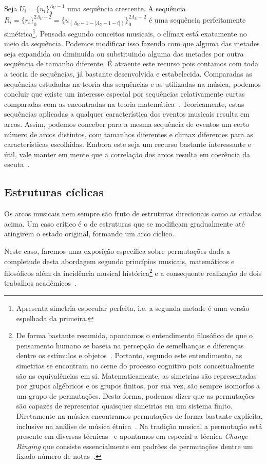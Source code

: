 Seja $U_i=\{u_i\}_0^{\Lambda_U-1}$ uma sequência crescente. A sequência 
$R_i=\{r_i\}_0^{2\Lambda_U -2}=\{u_{(\Lambda_U-1-|\Lambda_U-1-i|)}\}_0^{2\Lambda_U-2}$ 
é uma sequência perfeitamente simétrica\footnote{Apresenta simetria especular perfeita, i.e. a segunda metade é uma versão espelhada da primeira.}. Pensada segundo conceitos musicais, o clímax está exatamente no meio da sequência. Podemos modificar isso fazendo com que alguma das metades seja expandida ou diminuída ou substituindo alguma das metades por outra sequência de tamanho diferente. É atraente este recurso pois contamos com toda a teoria de sequências, já bastante desenvolvida e estabelecida. Comparadas as sequências estudadas na teoria das sequências e as utilizadas na música, podemos concluir que existe um interesse especial por sequências relativamente curtas comparadas com as encontradas na teoria matemática~\cite{Guidorizzo,Schoenberg}. Teoricamente, estas sequências aplicadas a qualquer característica dos eventos musicais resulta em arcos. 
Assim, podemos conceber para a mesma sequência de eventos um certo número de arcos distintos, com tamanhos diferentes e climax diferentes para as características escolhidas. Embora este seja um recurso
bastante interessante e útil, vale manter em mente que a correlação dos arcos resulta em coerência da escuta~\cite{Schachter}.

\subsection{Estruturas cíclicas}\label{estCic}
Os arcos musicais nem sempre são fruto de estruturas direcionais como as citadas
acima. Um caso crítico é o de estruturas que se modificam gradualmente
até atingirem o estado original, formando um arco cíclico.

Neste caso, faremos uma exposição específica sobre permutações dada
a completude desta abordagem segundo princípios musicais, matemáticos e
filosóficos além da incidência musical histórica\footnote{De
forma bastante resumida, apontamos o
entendimento filosófico de que o pensamento humano se baseia
na percepção de semelhanças e diferenças dentre os estímulos
e objetos~\cite{Deleuze}. Portanto, segundo este entendimento,
as simetrias se encontram no cerne do processo cognitivo pois conceitualmente são as equivalências em si. Matematicamente,
as simetrias são representadas por grupos algébricos e os grupos finitos, por sua vez,
são sempre isomorfos a um grupo de permutações. Desta forma, podemos dizer que
as permutações são capazes de representar quaisquer simetrias em um sistema finito.
Diretamente na música encontramos permutações de forma bastante explícita, inclusive
na análise de música étnica~\cite{permMusic}.
Na tradição musical a permutação está presente em diversas técnicas~\cite{Zamacois} e
apontamos em especial a técnica \emph{Change Ringing} que consiste essencialmente
em padrões de permutações dentre um fixado número de notas~\cite{change}.} e a consequente realização de dois trabalhos acadêmicos~\cite{figgusOriginal, figgusEspacializacao}.


